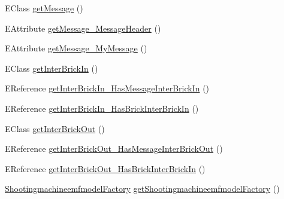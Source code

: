 \begin{DoxyCompactItemize}
E\-Class \hyperlink{interfaceshootingmachineemfmodel_1_1_shootingmachineemfmodel_package_a22f7d72713e5e103f3e8d509e1ce75ae}{get\-Message} ()
\item 
E\-Attribute \hyperlink{interfaceshootingmachineemfmodel_1_1_shootingmachineemfmodel_package_ad7f8ac42fa51f614c44066ce47a944c5}{get\-Message\-\_\-\-Message\-Header} ()
\item 
E\-Attribute \hyperlink{interfaceshootingmachineemfmodel_1_1_shootingmachineemfmodel_package_ac1bff97d907a89da3e0c7e155bbe0259}{get\-Message\-\_\-\-My\-Message} ()
\item 
E\-Class \hyperlink{interfaceshootingmachineemfmodel_1_1_shootingmachineemfmodel_package_a75b72a4b7df774851a80967c3aef8d30}{get\-Inter\-Brick\-In} ()
\item 
E\-Reference \hyperlink{interfaceshootingmachineemfmodel_1_1_shootingmachineemfmodel_package_aec9a28f393c21376d24d61e0d0797e35}{get\-Inter\-Brick\-In\-\_\-\-Has\-Message\-Inter\-Brick\-In} ()
\item 
E\-Reference \hyperlink{interfaceshootingmachineemfmodel_1_1_shootingmachineemfmodel_package_a6b156efbf364858e5844c0005559b6f1}{get\-Inter\-Brick\-In\-\_\-\-Has\-Brick\-Inter\-Brick\-In} ()
\item 
E\-Class \hyperlink{interfaceshootingmachineemfmodel_1_1_shootingmachineemfmodel_package_a72e34f104487df31838793891808a363}{get\-Inter\-Brick\-Out} ()
\item 
E\-Reference \hyperlink{interfaceshootingmachineemfmodel_1_1_shootingmachineemfmodel_package_a29e97d8fb26c24fbb7e9f60c2d5e8b33}{get\-Inter\-Brick\-Out\-\_\-\-Has\-Message\-Inter\-Brick\-Out} ()
\item 
E\-Reference \hyperlink{interfaceshootingmachineemfmodel_1_1_shootingmachineemfmodel_package_a66a9b40b728e83f852bb4f2556a1139f}{get\-Inter\-Brick\-Out\-\_\-\-Has\-Brick\-Inter\-Brick\-In} ()
\item 
\hyperlink{interfaceshootingmachineemfmodel_1_1_shootingmachineemfmodel_factory}{Shootingmachineemfmodel\-Factory} \hyperlink{interfaceshootingmachineemfmodel_1_1_shootingmachineemfmodel_package_a43a924cda032e157f0af7399cb0e5cbb}{get\-Shootingmachineemfmodel\-Factory} ()
\end{DoxyCompactItemize}
